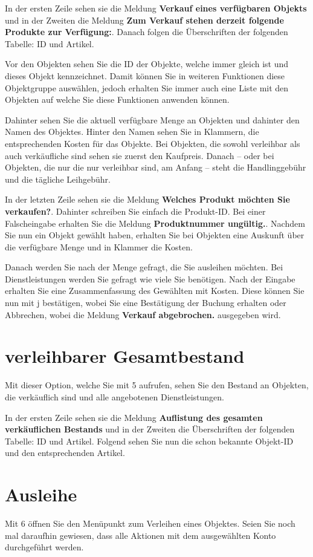 ﻿\documentclass[a4paper,12pt,titlepage]{article}
\newcommand\enquote[1]{{\ttfamily \bfseries #1}}
\begin{document}
In der ersten Zeile sehen sie die Meldung \enquote{Verkauf eines verfügbaren Objekts}
 und in der Zweiten die Meldung \enquote{Zum Verkauf stehen derzeit folgende Produkte zur Verfügung:}.
Danach folgen die Überschriften der folgenden Tabelle: ID und Artikel.

Vor den Objekten sehen Sie die ID der Objekte, welche immer gleich ist und dieses Objekt kennzeichnet.
Damit können Sie in weiteren Funktionen diese Objektgruppe auswählen,
 jedoch erhalten Sie immer auch eine Liste mit den Objekten auf welche Sie diese Funktionen anwenden können.

Dahinter sehen Sie die aktuell verfügbare Menge an Objekten und dahinter den Namen des Objektes.
Hinter den Namen sehen Sie in Klammern, die entsprechenden Kosten für das Objekte.
Bei Objekten, die sowohl verleihbar als auch verkäufliche sind sehen sie zuerst den Kaufpreis.
Danach -- oder bei Objekten, die nur die nur verleihbar sind, am Anfang --
steht die Handlinggebühr und die tägliche Leihgebühr.

In der letzten Zeile sehen sie die Meldung \enquote{Welches Produkt möchten Sie verkaufen?}.
Dahinter schreiben Sie einfach die Produkt-ID. Bei einer Falscheingabe erhalten Sie die Meldung \enquote{Produktnummer ungültig.}.
Nachdem Sie nun ein Objekt gewählt haben,
 erhalten Sie bei Objekten eine Auskunft über die verfügbare Menge und in Klammer die Kosten.

Danach werden Sie nach der Menge gefragt, die Sie ausleihen möchten.
Bei Dienstleistungen werden Sie gefragt wie viele Sie benötigen.
Nach der Eingabe erhalten Sie eine Zusammenfassung des Gewählten mit Kosten. 
Diese können Sie nun mit j bestätigen, wobei Sie eine Bestätigung der Buchung erhalten oder Abbrechen,
 wobei die Meldung \enquote{Verkauf abgebrochen.} ausgegeben wird.

\section{verleihbarer Gesamtbestand}
Mit dieser Option, welche Sie mit 5 aufrufen, sehen Sie den Bestand an Objekten,
 die verkäuflich sind und alle angebotenen Dienstleistungen.

In der ersten Zeile sehen sie die Meldung \enquote{Auflistung des gesamten verkäuflichen Bestands}
 und in der Zweiten die Überschriften der folgenden Tabelle: ID und Artikel.
Folgend sehen Sie nun die schon bekannte Objekt-ID und den entsprechenden Artikel.

\section{Ausleihe}
Mit 6 öffnen Sie den Menüpunkt zum Verleihen eines Objektes.
Seien Sie noch mal daraufhin gewiesen, dass alle Aktionen mit dem ausgewählten Konto durchgeführt werden.
\end{document}
